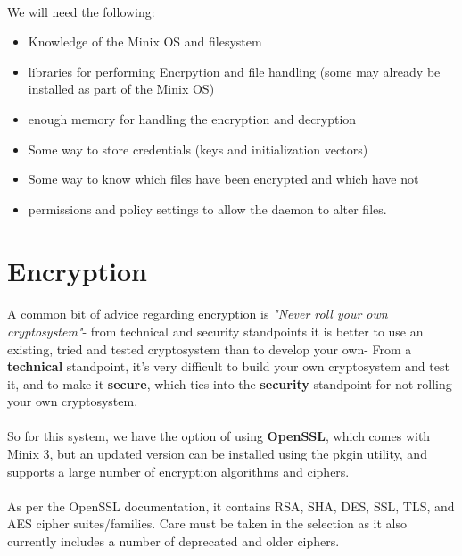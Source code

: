 \documentclass{article}
\begin{document}
\paragraph{}We will need the following:
\begin{itemize}
    \item Knowledge of the Minix OS and filesystem
    \item libraries for performing Encrpytion and file handling (some may already be installed as part of the Minix OS)
    \item enough memory for handling the encryption and decryption
    \item Some way to store credentials (keys and initialization vectors)
    \item Some way to know which files have been encrypted and which have not
    \item permissions and policy settings to allow the daemon to alter files.
\end{itemize}

\section{Encryption}
\paragraph{}A common bit of advice regarding encryption is \textit{"Never roll your own cryptosystem"}- from technical and security standpoints it is better to use an existing, tried and tested cryptosystem than to develop your own- From a \textbf{technical} standpoint, it's very difficult to build your own cryptosystem and test it, and to make it \textbf{secure}, which ties into the \textbf{security} standpoint for not rolling your own cryptosystem.

\paragraph{}So for this system, we have the option of using \textbf{OpenSSL}, which comes with Minix 3, but an updated version can be installed using the pkgin utility, and supports a large number of encryption algorithms and ciphers.

\paragraph{}As per the OpenSSL documentation, it contains RSA, SHA, DES, SSL, TLS, and AES cipher suites/families. Care must be taken in the selection as it also currently includes a number of deprecated and older ciphers.
\end{document}

